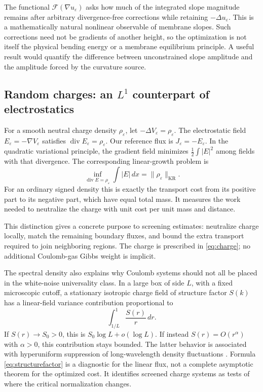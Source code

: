 \documentclass[11pt]{article}
\theoremstyle{definition}
\newcommand{\diver}{\operatorname{div}}
\newcommand{\KR}{\mathrm{KR}}
\newcommand{\cF}{\mathcal F}
\newcommand{\dd}{\,dx}
\begin{document}
The functional $\cF(\nabla u_\varepsilon)$ asks how much of the integrated
slope magnitude remains after arbitrary divergence-free corrections
while retaining $-\Delta u_\varepsilon$. This is a mathematically natural
nonlinear observable of membrane slopes. Such corrections need not be
gradients of another height, so the optimization is not itself the
physical bending energy or a membrane equilibrium principle. A useful
result would quantify the difference between unconstrained slope
amplitude and the amplitude forced by the curvature source.

\subsection{Random charges: an \texorpdfstring{$L^1$}{L1} counterpart of electrostatics}
For a smooth neutral charge density $\rho_\varepsilon$, let
$-\Delta V_\varepsilon=\rho_\varepsilon$. The electrostatic field
$E_\varepsilon=-\nabla V_\varepsilon$ satisfies
$\diver E_\varepsilon=\rho_\varepsilon$. Our reference flux is
$J_\varepsilon=-E_\varepsilon$. In the quadratic variational principle,
the gradient field minimizes $\frac12\int|E|^2$ among fields with that
divergence. The corresponding linear-growth problem is
\begin{equation}\label{eq:charge}
  \inf_{\diver E=\rho_\varepsilon}\int|E|\dd
  =\|\rho_\varepsilon\|_{\KR}.
\end{equation}
For an ordinary signed density this is exactly the transport cost from
its positive part to its negative part, which have equal total mass.
It measures the work needed to neutralize the charge with unit cost per
unit mass and distance.

This distinction gives a concrete purpose to screening estimates:
neutralize charge locally, match the remaining boundary fluxes, and
bound the extra transport required to join neighboring regions. The
charge is prescribed in \eqref{eq:charge}; no additional Coulomb-gas
Gibbs weight is implicit.

The spectral density also explains why Coulomb systems should not all
be placed in the white-noise universality class. In a large box of side
$L$, with a fixed microscopic cutoff, a stationary isotropic charge
field of structure factor $S(k)$ has a linear-field variance contribution
proportional to
\begin{equation}\label{eq:structurefactor}
  \int_{1/L}^{1}\frac{S(r)}r\,dr.
\end{equation}
If $S(r)\to S_0>0$, this is $S_0\log L+o(\log L)$. If instead
$S(r)=O(r^\alpha)$ with $\alpha>0$, this contribution stays bounded.
The latter behavior is associated with hyperuniform suppression of
long-wavelength density fluctuations \cite{TS}. Formula
\eqref{eq:structurefactor} is a diagnostic for the linear flux, not a
complete asymptotic theorem for the optimized cost. It identifies
screened charge systems as tests of where the critical normalization
changes.
\end{document}
